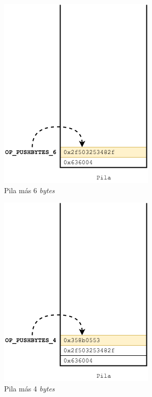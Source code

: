 \documentclass{article}
\begin{document}
    \vspace{1mm}
    \noindent
    \begin{minipage}{0.50\textwidth}
        \begin{figure}[H]
        \centering
            \includegraphics[scale=0.57]{img/Bitcoin_transactions_stack_02.png}
            \caption{Pila más 6 \textit{bytes}}
        \end{figure}
    \end{minipage}
    \hfill
    \noindent
    \begin{minipage}{0.50\textwidth}
        \begin{figure}[H]
        \centering
            \includegraphics[scale=0.57]{img/Bitcoin_transactions_stack_03.png}
            \caption{Pila más 4 \textit{bytes}}
        \end{figure}
    \end{minipage}
    
\end{document}
